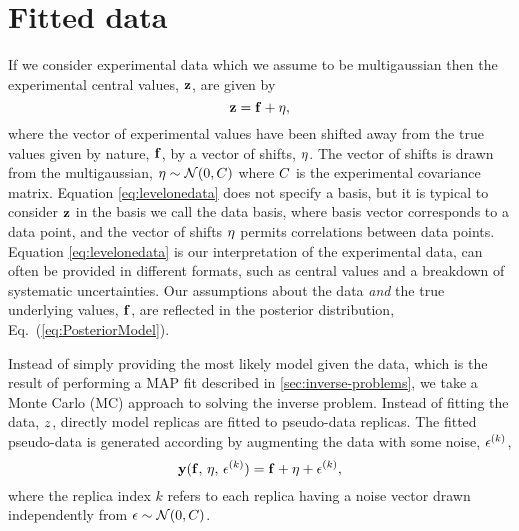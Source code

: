 \section{Fitted data}
If we consider experimental data which we assume
to be multigaussian then the experimental central values,
$\mathbf{z}$, are given by
\begin{equation}\label{eq:levelonedata}
    \mathbf{z} = \mathbf{f} + \mathbf{\eta},
\end{equation}
where the vector of experimental values have been shifted away from
the true values given by nature, $\mathbf{f}$, by a vector of shifts,
$\mathbf{\eta}$. The vector of shifts
is drawn from
the multigaussian, $\mathbf{\eta} \sim \mathcal{N}(0, C)$ where $C$ is the
experimental covariance matrix. Equation \eqref{eq:levelonedata} does not specify
a basis, but it is typical to consider $\mathbf{z}$ in the basis we call the
data basis, where basis vector corresponds to a data point, and the vector of
shifts $\mathbf{\eta}$ permits correlations between data points.
Equation \eqref{eq:levelonedata} is our interpretation of the
experimental data, can often be provided in different formats, such as central
values and a breakdown of systematic uncertainties. Our assumptions about the data
{\em and} the true underlying values, $\mathbf{f}$,
are reflected in the posterior distribution, Eq.~(\ref{eq:PosteriorModel}).

Instead of simply providing the most likely model given the data, which is
the result of performing a MAP fit described in \ref{sec:inverse-problems},
we take a Monte Carlo (MC) approach to solving the inverse problem. Instead
of fitting the data, $z$, directly model replicas are fitted to
pseudo-data replicas. The fitted pseudo-data is generated according by
augmenting the data with some noise, $\epsilon^{(k)}$,
\begin{equation}\label{eq:leveltwodata1}
    \mathbf{y}(\mathbf{f},\,\mathbf{\eta},\,\mathbf{\epsilon}^{(k)})
    = \mathbf{f} + \mathbf{\eta} + \mathbf{\epsilon}^{(k)},
\end{equation}
where the replica index $k$ refers to each replica having a noise vector drawn
independently from $\mathbf{\epsilon} \sim \mathcal{N}(0, C)$.

